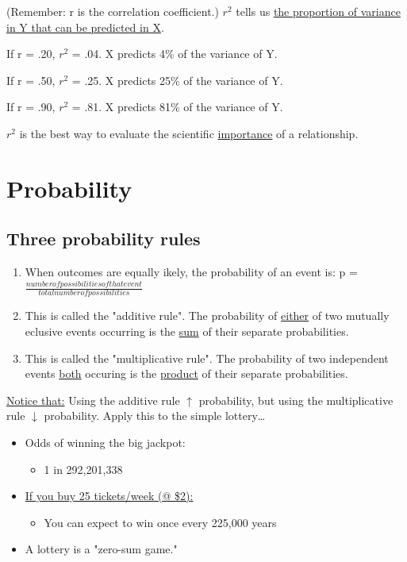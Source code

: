 \documentclass[11pt]{report}
\begin{document}
(Remember: r is the correlation coefficient.)\newline 
$r^2$ tells us \underline{the proportion of variance in Y that can be predicted in X}. \newline

\begin{multicols}{3}
    \noindent If r = .20, $r^2$ = .04. X predicts 4\% of the variance of Y.
    \columnbreak

    If r = .50, $r^2$ = .25. X predicts 25\% of the variance of Y. 
    \columnbreak
    
    If r = .90, $r^2$ = .81. X predicts 81\% of the variance of Y.
\end{multicols}
\noindent $r^2$ is the best way to evaluate the scientific \underline{importance} of a relationship. 

\section{Probability}

\subsection{Three probability rules}
\begin{enumerate}
    \item When outcomes are equally ikely, the probability of an event is: p = $\frac{number of possibilities of that event}{total number of possibilities}$
    \item This is called the "additive rule". The probability of \underline{either} of two mutually eclusive events occurring is the \underline{sum} of their separate probabilities.
    \item This is called the "multiplicative rule". The probability of two independent events \underline{both} occuring is the \underline{product} of their separate probabilities.
\end{enumerate}

\underline{Notice that:} Using the additive rule $\uparrow$ probability, but using the multiplicative rule $\downarrow$ probability. Apply this to the simple lottery\dots

{
    \begin{itemize}
        \item Odds of winning the big jackpot:
        \begin{itemize}
            \item 1 in 292,201,338
        \end{itemize}
        \item \underline{If you buy 25 tickets/week (@ \$2):}
        \begin{itemize}
            \item You can expect to win once every 225,000 years
        \end{itemize}
        \item A lottery is a "zero-sum game."
    \end{itemize}
}
\end{document}
